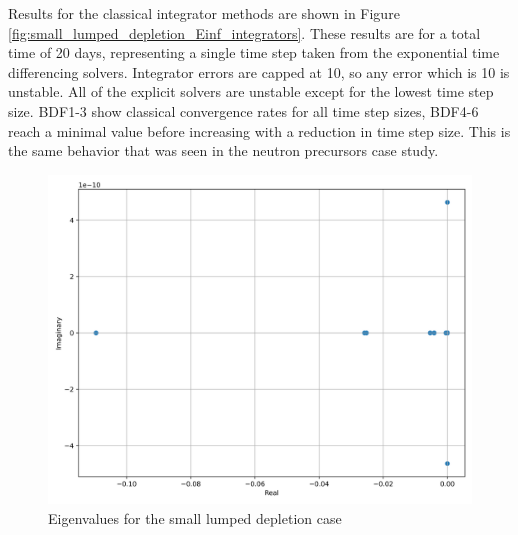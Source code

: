 Results for the classical integrator methods are shown in Figure \ref{fig:small_lumped_depletion_Einf_integrators}. These results are for a total time of 20 days, representing a single time step taken from the exponential time differencing solvers. Integrator errors are capped at 10, so any error which is 10 is unstable. All of the explicit solvers are unstable except for the lowest time step size. BDF1-3 show classical convergence rates for all time step sizes, BDF4-6 reach a minimal value before increasing with a reduction in time step size. This is the same behavior that was seen in the neutron precursors case study. 


\clearpage

\begin{figure}[p]
    \centering
    \includegraphics[width=5in]{images/chapter-5/caseStudies/smallLumpedDepletion/msrLumpedDepletionSmallEigenvalues.png}
    \caption{Eigenvalues for the small lumped depletion case}
    \label{fig:small_lumped_depletion_eigenvalues}
\end{figure}

\clearpage

